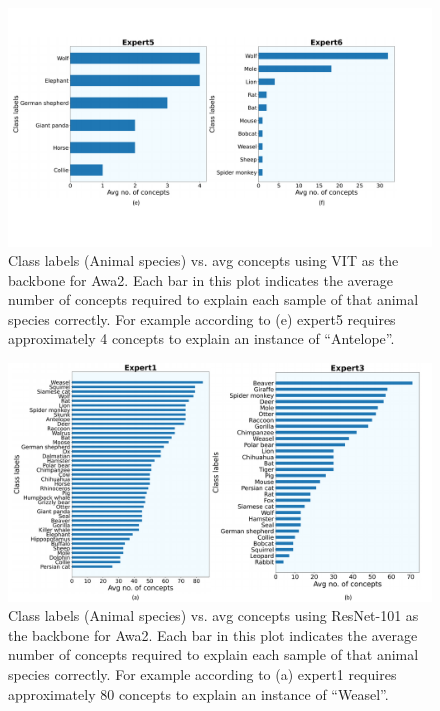 \begin{figure}
\centering
\includegraphics[width=1\linewidth]
{figures/Supp/Avg_concept_class_VIT_Awa2_3.pdf}
\caption{Class labels (Animal species) vs. avg concepts using VIT as the backbone for Awa2. Each bar in this plot indicates the average number of concepts required to explain each sample of that animal species correctly. For example according to (e) expert5 requires approximately 4 concepts to explain an instance of ``Antelope''.}
\label{fig:Awa2_VIT_c}
\end{figure}

\begin{figure}[t]
\centering
\includegraphics[width=1\linewidth]
{figures/Supp/Avg_concept_class_CNN_Awa2_1.pdf}
\caption{Class labels (Animal species) vs. avg concepts using ResNet-101 as the backbone for Awa2. Each bar in this plot indicates the average number of concepts required to explain each sample of that animal species correctly. For example according to (a) expert1 requires approximately 80 concepts to explain an instance of ``Weasel''.}
\label{fig:Awa2_CNN_a}
\end{figure}

